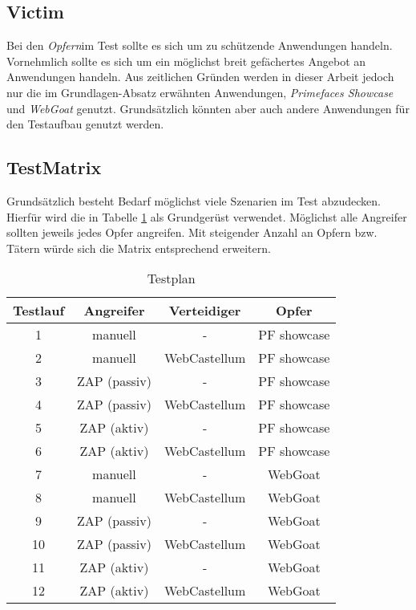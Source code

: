 \subsection{Victim}

Bei den \glqq\emph{Opfern}\grqq  im Test sollte es sich um zu schützende Anwendungen handeln. Vornehmlich sollte es sich um ein möglichst breit gefächertes Angebot an Anwendungen handeln. Aus zeitlichen Gründen werden in dieser Arbeit jedoch nur die im Grundlagen-Absatz erwähnten Anwendungen, \emph{Primefaces Showcase} und \emph{WebGoat} genutzt. Grundsätzlich könnten aber auch andere Anwendungen für den Testaufbau genutzt werden.\\ 

\subsection{TestMatrix}
Grundsätzlich besteht Bedarf möglichst viele Szenarien im Test abzudecken. Hierfür wird die in Tabelle \ref{tab:testplan} als Grundgerüst verwendet. Möglichst alle Angreifer sollten jeweils jedes Opfer angreifen. Mit steigender Anzahl an Opfern bzw. Tätern würde sich die Matrix entsprechend erweitern. 

\begin{table}[h]
    \centering
    \begin{tabular}{cccc} 
      \toprule
    \textbf{Testlauf} & \textbf{Angreifer} & \textbf{Verteidiger} & \textbf{Opfer} \\ 
     \midrule
     1 & manuell & - & PF showcase\\
     2 & manuell & WebCastellum & PF showcase \\
     3 & ZAP (passiv) & - & PF showcase\\
     4 & ZAP (passiv) & WebCastellum & PF showcase \\
     5 & ZAP (aktiv) & - & PF showcase\\
     6 & ZAP (aktiv) & WebCastellum & PF showcase \\
     7 & manuell & - & WebGoat \\ 
    8 & manuell & WebCastellum & WebGoat \\
    9 & ZAP (passiv) & - & WebGoat \\ 
    10 & ZAP (passiv) & WebCastellum & WebGoat \\
    11 & ZAP (aktiv) & - & WebGoat \\ 
    12 & ZAP (aktiv) & WebCastellum & WebGoat \\
   \bottomrule
    \end{tabular}
    \caption{Testplan}
    \label{tab:testplan}
\end{table}

